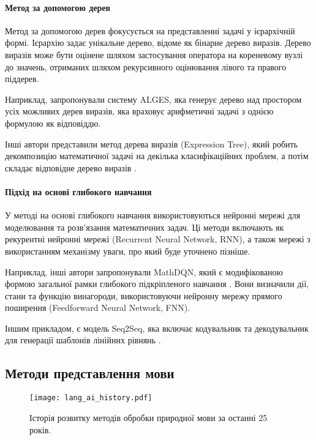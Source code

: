 \paragraph{Метод за допомогою дерев}
Метод за допомогою дерев фокусується на представленні задачі у ієрархічній формі. Ієрархію задає унікальне дерево, відоме як бінарне дерево виразів. Дерево виразів може бути оцінене шляхом застосування оператора на кореневому вузлі до значень, отриманих шляхом рекурсивного оцінювання лівого та правого піддерев.

Наприклад, \cite{koncel-kedziorski-etal-2015-parsing} запропонували систему ALGES, яка генерує дерево над простором усіх можливих дерев виразів, яка враховує арифметичні задачі з однією формулою як відповіддю.

Інші автори представили метод дерева виразів (Expression Tree), який робить декомпозицію математичної задачі на декілька класифікаційних проблем, а потім складає відповідне дерево виразів \cite{roy2016solvinggeneralarithmeticword}.

\paragraph{Підхід на основі глибокого навчання}
У методі на основі глибокого навчання використовуються нейронні мережі для моделювання та розв'язання математичних задач. Ці методи включають як рекурентні нейронні мережі (Recurrent Neural Network, RNN), а також мережі з використанням механізму уваги, про який буде уточнено пізніше.

Наприклад, інші автори запропонували MathDQN, який є модифікованою формою загальної рамки глибокого підкріпленого навчання \cite{Wang_Zhang_Gao_Song_Guo_Shen_2018}. Вони визначили дії, стани та функцію винагороди, використовуючи нейронну мережу прямого поширення (Feedforward Neural Network, FNN).

Іншим прикладом, є модель Seq2Seq, яка включає кодувальник та декодувальник для генерації шаблонів лінійних рівнянь \cite{wang2018translatingmathwordproblem}.

\subsection{Методи представлення мови}

\begin{figure}[!h]
    \centering
    \texttt{[image: lang\_ai\_history.pdf]}
    \caption{Історія розвитку методів обробки природної мови за останні 25 років.}
    \label{fig:peek_language_ai}
\end{figure}

